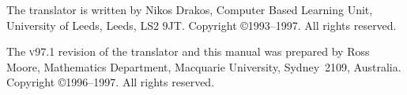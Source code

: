 \smallskip
{}\html{\\}%
The \latextohtml{} translator is written by Nikos Drakos,
Computer Based Learning Unit,  University of Leeds,  Leeds,  LS2 9JT.
Copyright \copyright 1993--1997. All rights reserved.

\smallskip
{}\html{\\}%
The \textsc{v97.1} revision of the \latextohtml{} translator and this manual
was prepared by Ross Moore, Mathematics Department,
Macquarie University,  Sydney~2109,  Australia.
Copyright \copyright 1996--1997. All rights reserved.







